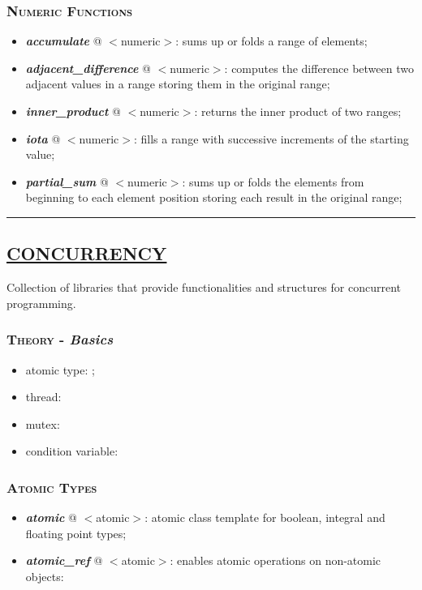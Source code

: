 \documentclass[10pt]{article}
\begin{document}
\begin{multicols*}{5}
{\subsubsection*{\textsc{Numeric Functions}} 
\begin{itemize}[leftmargin=*,topsep=0.25pt]
  \setlength\itemsep{-1.8pt}
	\item  \emph{\textbf{accumulate}} @ $<$numeric$>$: sums up or folds a range of elements;
	\item  \emph{\textbf{adjacent\_difference}} @ $<$numeric$>$: computes the difference between two adjacent values in a range storing them in the original range;
	\item  \emph{\textbf{inner\_product}} @ $<$numeric$>$: returns the inner product of two ranges;
	\item  \emph{\textbf{iota}} @ $<$numeric$>$: fills a range with successive increments of the starting value;
	\item  \emph{\textbf{partial\_sum}} @ $<$numeric$>$: sums up or folds the elements from beginning to each element position storing each result in the original range;
\end{itemize}
}

\par\noindent\rule{155pt}{0.4pt}


{\color{Blue}
\subsection*{\href{https://en.cppreference.com/w/cpp/thread}{\underline{CONCURRENCY}}}	
\noindent
Collection of libraries that provide functionalities and structures for concurrent programming.

\subsubsection*{\textsc{Theory} - \emph{Basics}} 
\begin{itemize}[leftmargin=*,topsep=0.25pt]
  \setlength\itemsep{-1.8pt}
	\item  atomic type: ;
	\item  thread:  
	\item  mutex:  
	\item condition variable: 
\end{itemize}



\subsubsection*{\textsc{Atomic Types}} 
\begin{itemize}[leftmargin=*,topsep=0.25pt]
  \setlength\itemsep{-1.8pt}
	\item  \emph{\textbf{atomic}} @ $<$atomic$>$: atomic class template for boolean, integral and floating point types;
	\item  \emph{\textbf{atomic\_ref}} @ $<$atomic$>$: enables atomic operations on non-atomic objects: 
\end{itemize}


}
\end{multicols*}
\end{document}
